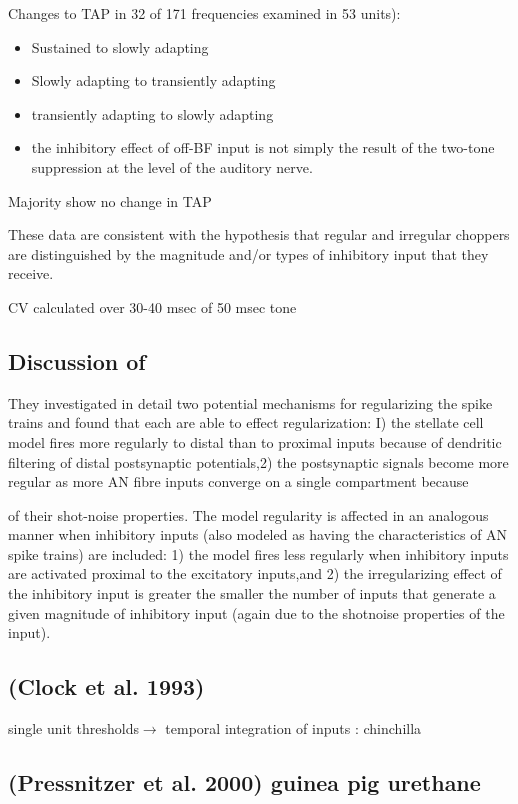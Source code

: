 \documentclass[10pt,a4paper]{article}
\begin{document}
Changes to TAP in 32 of 171 frequencies examined in 53 units):


\begin{itemize}
\item Sustained to slowly adapting
\item Slowly adapting to transiently adapting
\item transiently adapting to slowly adapting
\item the inhibitory effect of off-BF input is not simply the result of the
  two-tone suppression at the level of the auditory nerve.
\end{itemize}
Majority show no change in TAP

These data are consistent with the hypothesis that regular and irregular
choppers are distinguished by the magnitude and/or types of inhibitory input
that they receive.

CV calculated over 30-40 msec of 50 msec tone

\subsection{Discussion of \citep{BanksSachs:1991}}
 They investigated in detail two potential
mechanisms for regularizing the spike trains and found that each are able to
effect regularization: I) the stellate cell model fires more regularly to distal
than to proximal inputs because of dendritic filtering of distal postsynaptic
potentials,2) the postsynaptic signals become more regular as more AN fibre
inputs converge on a single compartment because

of their shot-noise properties. The model regularity is affected in an analogous
manner when inhibitory inputs (also modeled as having the characteristics of AN
spike trains) are included: 1) the model fires less regularly when inhibitory
inputs are activated proximal to the excitatory inputs,and 2) the irregularizing
effect of the inhibitory input is greater the smaller the number of inputs that
generate a given magnitude of inhibitory input (again due to the shotnoise
properties of the input).

\subsection{(Clock et al. 1993)}
single unit thresholds\ensuremath{\rightarrow} temporal
integration of inputs : chinchilla

\subsection{(Pressnitzer et al. 2000) guinea pig urethane}
\end{document}
